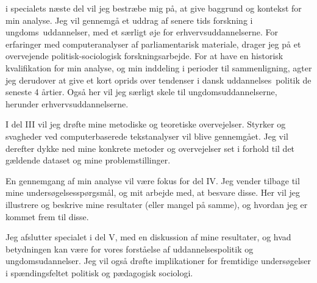i specialets næste del vil jeg bestræbe mig på, at give baggrund og kontekst for min analyse.
Jeg vil gennemgå et uddrag af senere tids forskning i ungdoms\ uddannelser, med et særligt øje for erhvervsuddannelserne.
For erfaringer med computeranalyser af parliamentarisk materiale, drager jeg på et overvejende politisk-sociologisk forskningsarbejde.
For at have en historisk kvalifikation for min analyse, og min inddeling i perioder til sammenligning, agter jeg derudover at give et kort oprids over tendenser i dansk uddannelses\ politik de seneste 4 årtier.
Også her vil jeg særligt skele til ungdomsuddannelserne, herunder erhvervsuddannelserne.

I del III vil jeg drøfte mine metodiske og teoretiske overvejelser.
Styrker og svagheder ved computerbaserede tekstanalyser vil blive gennemgået. Jeg vil derefter dykke ned mine konkrete metoder og overvejelser set i forhold til det gældende dataset og mine problemstillinger.

En gennemgang af min analyse vil være fokus for del IV.
Jeg vender tilbage til mine undersøgelsesspørgsmål, og mit arbejde med, at besvare disse.
Her vil jeg illustrere og beskrive mine resultater (eller mangel på samme), og hvordan jeg er kommet frem til disse.

Jeg afslutter specialet i del V, med en diskussion af mine resultater, og hvad betydningen kan være for vores forståelse af uddannelsespolitik og ungdomsudannelser. Jeg vil også drøfte implikationer for fremtidige undersøgelser i spændingsfeltet politisk og pædagogisk sociologi.
